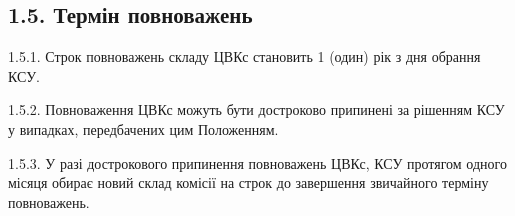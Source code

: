 \subsection*{1.5. Термін повноважень}
    1.5.1. Строк повноважень складу ЦВКс становить 1 (один) рік з дня обрання КСУ.

    1.5.2. Повноваження ЦВКс можуть бути достроково припинені за рішенням КСУ у випадках, передбачених цим Положенням.

    1.5.3. У разі дострокового припинення повноважень ЦВКс, КСУ протягом одного місяця обирає новий склад комісії на строк до завершення звичайного терміну повноважень.